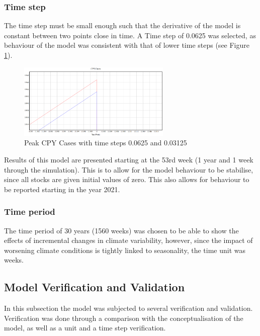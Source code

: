 \subsubsection{Time step}
The time step must be small enough such that the derivative of the model is constant between two points close in time. A Time step of 0.0625 was selected, as behaviour of the model was consistent with that of lower time steps (see Figure \ref{fig:cpy cases with time step}).

\begin{figure}[h!]
\centering
\includegraphics[width=0.65\textwidth]{images/timestep.PNG}
\caption{Peak CPY Cases with time steps 0.0625 and 0.03125}
\label{fig:cpy cases with time step}
\end{figure}

Results of this model are presented starting at the 53rd week (1 year and 1 week through the simulation). This is to allow for the model behaviour to be stabilise, since all stocks are given initial values of zero. This also allows for behaviour to be reported starting in the year 2021.

\subsubsection{Time period}
The time period of 30 years (1560 weeks) was chosen to be able to show the effects of incremental changes in climate variability, however, since the impact of worsening climate conditions is tightly linked to seasonality, the time unit was weeks. %

\subsection{Model Verification and Validation}
In this subsection the model was subjected to several verification and validation. Verification was done through a comparison with the conceptualisation of the model, as well as a unit and a time step verification. 

